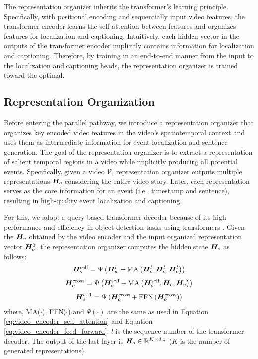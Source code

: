The representation organizer inherits the transformer's learning principle.
Specifically, with positional encoding and sequentially input video features, the transformer encoder learns the self-attention between features and organizes features for localization and captioning.
Intuitively, each hidden vector in the outputs of the transformer encoder implicitly contains information for localization and captioning. Therefore, by training in an end-to-end manner from the input to the localization and captioning heads, the representation organizer is trained toward the optimal.

\subsection{Representation Organization}
\label{subsec:method_representation_organization}
Before entering the parallel pathway, we introduce a representation organizer that organizes key encoded video features in the video's spatiotemporal context and uses them as intermediate information for event localization and sentence generation.
The goal of the representation organizer is to extract a representation of salient temporal regions in a video while implicitly producing all potential events.
Specifically, given a video $\mathcal{V}$, representation organizer outputs multiple representations $\bm{H}_o$ considering the entire video story.
Later, each representation serves as the core information for an event (i.e., timestamp and sentence), resulting in high-quality event localization and captioning.

For this, we adopt a query-based transformer decoder \cite{carion2020end,zhu2021deformable} because of its high performance and efficiency in object detection tasks using transformers \cite{vaswani2017attention}.
Given the $\bm{H}_v$ obtained by the video encoder and the input organized representation vector $\bm{H}_o^0$, the representation organizer computes the hidden state $\bm{H}_o$ as follows:
\begin{equation}
  \bm{H}_o^{\text{self}} = \Psi \left( \bm{H}_w^l + \text{MA} \left(\bm{H}_o^l, \bm{H}_o^l, \bm{H}_o^l \right) \right)
  \label{eq:representation_organization_self_attention}
\end{equation}
\begin{equation}
  \bm{H}_o^{\text{cross}} = \Psi \left( \bm{H}_o^{\text{self}} + \text{MA} \left( \bm{H}_o^{\text{self}}, \bm{H}_v, \bm{H}_v \right) \right)
  \label{eq:representation_organization_cross_attention}
\end{equation}
\begin{equation}
  \bm{H}_o^{l+1} = \Psi \left( \bm{H}_o^{\text{cross}} + \text{FFN}\left( \bm{H}_o^{\text{cross}} \right) \right)
  \label{eq:representation_organization_ffn}
\end{equation}
where, MA($\cdot$), FFN($\cdot$) and $\Psi \left(\cdot\right)$ are the same as used in Equation \ref{eq:video_encoder_self_attention} and Equation \ref{eq:video_encoder_feed_forward}.
$l$ is the sequence number of the transformer decoder.
The output of the last layer is $\bm{H}_o \in \mathbb{R}^{K \times d_m}$ ($K$ is the number of generated representations).

